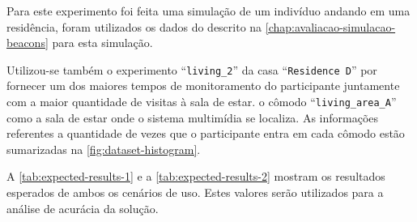 Para este experimento foi feita uma simulação de um indivíduo andando em uma residência, foram utilizados os dados do \dataset{} descrito na \autoref{chap:avaliacao-simulacao-beacons} para esta simulação.

Utilizou-se também o experimento ``\texttt{living\_2}'' da casa ``\texttt{Residence D}'' por fornecer um dos maiores tempos de monitoramento do participante juntamente com a maior quantidade de visitas à sala de estar. o cômodo ``\texttt{living\_area\_A}'' como a sala de estar onde o sistema multimídia se localiza. As informações referentes a quantidade de vezes que o participante entra em cada cômodo estão sumarizadas na \autoref{fig:dataset-histogram}.


A \autoref{tab:expected-results-1} e a \autoref{tab:expected-results-2} mostram os resultados esperados de ambos os cenários de uso. Estes valores serão utilizados para a análise de acurácia da solução.

